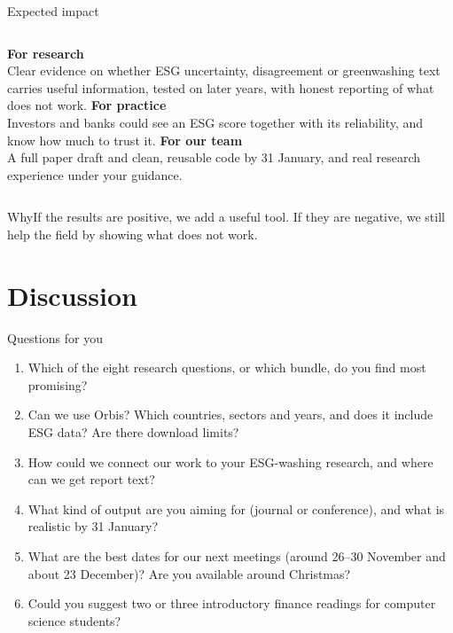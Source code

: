 \documentclass[aspectratio=169,11pt]{beamer}
\newcommand{\why}[1]{\vspace{2pt}\begin{block}{Why}#1\end{block}}
\begin{document}
\begin{frame}[t]{Expected impact}
\begin{columns}[T]
\textbf{\color{teal}For research}\\[3pt]
Clear evidence on whether ESG uncertainty, disagreement or greenwashing text carries useful information, tested on later years, with honest reporting of what does not work.
\textbf{\color{coral}For practice}\\[3pt]
Investors and banks could see an ESG score together with its reliability, and know how much to trust it.
\textbf{\color{plum}For our team}\\[3pt]
A full paper draft and clean, reusable code by 31 January, and real research experience under your guidance.
\end{columns}
\vspace{10pt}
\why{If the results are positive, we add a useful tool. If they are negative, we still help the field by showing what does not work.}
\end{frame}

\section{Discussion}
\begin{frame}[t]{Questions for you}
\small
\begin{enumerate}
\setlength{\itemsep}{5pt}
\item Which of the eight research questions, or which bundle, do you find most promising?
\item Can we use Orbis? Which countries, sectors and years, and does it include ESG data? Are there download limits?
\item How could we connect our work to your ESG-washing research, and where can we get report text?
\item What kind of output are you aiming for (journal or conference), and what is realistic by 31 January?
\item What are the best dates for our next meetings (around 26--30 November and about 23 December)? Are you available around Christmas?
\item Could you suggest two or three introductory finance readings for computer science students?
\end{enumerate}
\end{frame}
\end{document}
